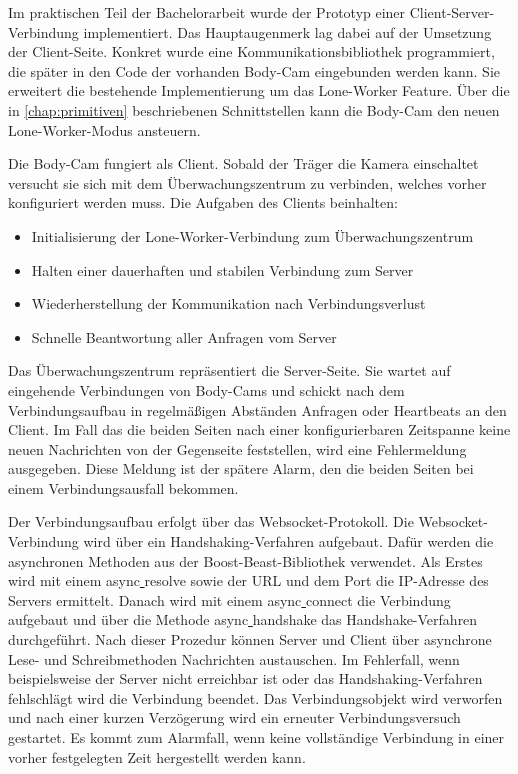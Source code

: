\documentclass[thesis.tex]{subfiles}
\begin{document}
Im praktischen Teil der Bachelorarbeit wurde der Prototyp einer Client-Server-Verbindung implementiert.
Das Hauptaugenmerk lag dabei auf der Umsetzung der Client-Seite.
Konkret wurde eine Kommunikationsbibliothek programmiert, die später in den Code der vorhanden Body-Cam eingebunden werden kann.
Sie erweitert die bestehende Implementierung um das Lone-Worker Feature.
Über die in \autoref{chap:primitiven} beschriebenen Schnittstellen kann die Body-Cam den neuen Lone-Worker-Modus ansteuern.

Die Body-Cam fungiert als Client.
Sobald der Träger die Kamera einschaltet versucht sie sich mit dem Überwachungszentrum zu verbinden, welches vorher konfiguriert werden muss.
Die Aufgaben des Clients beinhalten:
\begin{itemize}
    \item Initialisierung der Lone-Worker-Verbindung zum Überwachungszentrum
    \item Halten einer dauerhaften und stabilen Verbindung zum Server
    \item Wiederherstellung der Kommunikation nach Verbindungsverlust
    \item Schnelle Beantwortung aller Anfragen vom Server
\end{itemize}

Das Überwachungszentrum repräsentiert die Server-Seite.
Sie wartet auf eingehende Verbindungen von Body-Cams und schickt nach dem Verbindungsaufbau in regelmäßigen Abständen Anfragen oder Heartbeats an den Client.
Im Fall das die beiden Seiten nach einer konfigurierbaren Zeitspanne keine neuen Nachrichten von der Gegenseite feststellen, wird eine Fehlermeldung ausgegeben.
Diese Meldung ist der spätere Alarm, den die beiden Seiten bei einem Verbindungsausfall bekommen.

Der Verbindungsaufbau erfolgt über das Websocket-Protokoll.
Die Websocket-Verbindung wird über ein Handshaking-Verfahren aufgebaut.
Dafür werden die asynchronen Methoden aus der Boost-Beast-Bibliothek verwendet.
Als Erstes wird mit einem \glqq async\underline{ }resolve\grqq{} sowie der URL und dem Port die IP-Adresse des Servers ermittelt.
Danach wird mit einem \glqq async\underline{ }connect\grqq{} die Verbindung aufgebaut und über die Methode \glqq async\underline{ }handshake\grqq{} das Handshake-Verfahren durchgeführt.
Nach dieser Prozedur können Server und Client über asynchrone Lese- und Schreibmethoden Nachrichten austauschen.
Im Fehlerfall, wenn beispielsweise der Server nicht erreichbar ist oder das Handshaking-Verfahren fehlschlägt wird die Verbindung beendet.
Das Verbindungsobjekt wird verworfen und nach einer kurzen Verzögerung wird ein erneuter Verbindungsversuch gestartet.
Es kommt zum Alarmfall, wenn keine vollständige Verbindung in einer vorher festgelegten Zeit hergestellt werden kann.
\end{document}
